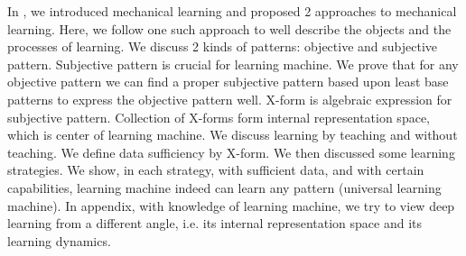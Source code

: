 In  \cite{paper1}, we introduced mechanical learning and proposed 2 approaches to mechanical learning.  Here, we follow one such approach to well describe the objects and the processes of learning. We discuss 2 kinds of patterns: objective and subjective pattern. Subjective pattern is crucial for learning machine. We prove that for any objective pattern we can find a proper subjective pattern based upon least base patterns to express the objective pattern well. X-form is algebraic expression for subjective pattern. Collection of X-forms form internal representation space, which is center of learning machine. We discuss learning by teaching and without teaching. We define data sufficiency by X-form. We then discussed some learning strategies. We show, in each strategy, with sufficient data, and with certain capabilities, learning machine indeed can learn any pattern (universal learning machine). In appendix, with knowledge of learning machine, we try to view deep learning from a different angle, i.e. its internal representation space and its learning dynamics.

